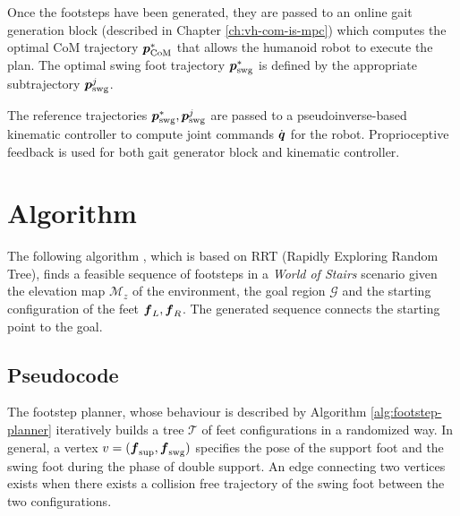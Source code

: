 Once the footsteps have been generated, they are passed to an online gait 
generation block (described in Chapter \ref{ch:vh-com-is-mpc}) which computes
the 
optimal CoM trajectory ${\mbox{\boldmath $p$}}_{\rm CoM}^*$ that allows the humanoid robot to
execute the plan. The optimal swing foot trajectory ${\mbox{\boldmath $p$}}_{\rm {swg}}^*$ is 
defined by the appropriate subtrajectory ${\mbox{\boldmath $p$}}_{\rm {swg}}^j$.

The reference trajectories ${\mbox{\boldmath $p$}}_{\rm {swg}}^*, {\mbox{\boldmath $p$}}_{\rm {swg}}^j$ are passed
to a pseudoinverse-based kinematic controller to compute joint commands
$\dot{{\mbox{\boldmath $q$}}}$ for the robot.
Proprioceptive feedback is used for both gait generator block 
and kinematic controller.

\section{Algorithm}
The following algorithm \cite{ECC19}, which is based on RRT (Rapidly Exploring
Random Tree), finds a feasible sequence of footsteps in a
\textit{World of Stairs} scenario given the elevation map $\mathcal{M}_z$ of the 
environment,
the goal region $\mathcal{G}$ and the starting configuration of the feet
${\mbox{\boldmath $f$}}_L, {\mbox{\boldmath $f$}}_R$. The generated sequence connects the starting point to the
goal.

\subsection{Pseudocode}
The footstep planner, whose behaviour is described by Algorithm
\ref{alg:footstep-planner} iteratively builds a tree $\mathcal{T}$ of feet 
configurations in a randomized way. In general, a vertex $v=({\mbox{\boldmath $f$}}_{\rm {sup}},
{\mbox{\boldmath $f$}}_{\rm {swg}})$ specifies the pose of the support foot and the swing foot 
during the phase of double support. An edge connecting two vertices exists 
when there exists a collision free trajectory of the swing foot between 
the two configurations.

